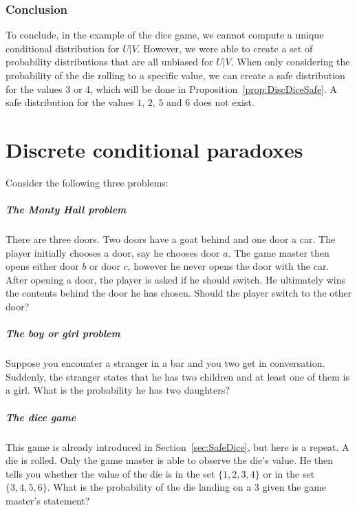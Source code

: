\documentclass[a4paper]{report}
\theoremstyle{plain}
\theoremstyle{definition}
\theoremstyle{remark}
\numberwithin{equation}{chapter}
\DeclareMathOperator{\1}{\mathbbm{1}}
\begin{document}
\subsection{Conclusion}
To conclude, in the example of the dice game, we cannot compute a unique conditional distribution for $U|V$. However, we were able to create a set of probability distributions that are all unbiased for $U|V$. When only considering the probability of the die rolling to a specific value, we can create a safe distribution for the values 3 or 4, which will be done in Proposition~\ref{prop:DiscDiceSafe}. A safe distribution for the values $1$, $2$, $5$ and $6$ does not exist.

\chapter{Discrete conditional paradoxes}\label{chap:DiscPara}
Consider the following three problems:

\paragraph{The Monty Hall problem}
There are three doors. Two doors have a goat behind and one door a car. The player initially chooses a door, say he chooses door $a$. The game master then opens either door $b$ or door $c$, however he never opens the door with the car. After opening a door, the player is asked if he should switch. He ultimately wins the contents behind the door he has chosen. Should the player switch to the other door?


\paragraph{The boy or girl problem}
Suppose you encounter a stranger in a bar and you two get in conversation. Suddenly, the stranger states that he has two children and at least one of them is a girl. What is the probability he has two daughters?

\paragraph{The dice game}
This game is already introduced in Section~\ref{sec:SafeDice}, but here is a repeat. A die is rolled. Only the game master is able to observe the die's value. He then tells you whether the value of the die is in the set $\{1,2,3,4\}$ or in the set $\{3,4,5,6\}$. What is the probability of the die landing on a $3$ given the game master's statement?
\end{document}
